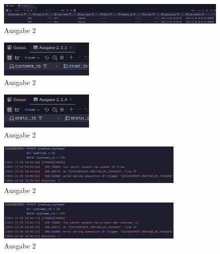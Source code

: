 \documentclass[12pt]{scrartcl}
\begin{document}
\pagebreak

\begin{figure}[H]
	\centering
	\includegraphics[width=1\textwidth]{../2_3_2.png}
	\caption{Ausgabe 2}
\end{figure}

\begin{figure}[H]
	\centering
	\includegraphics[width=0.4\textwidth]{../2_3_3.png}
	\caption{Ausgabe 2}
\end{figure}

\begin{figure}[H]
	\centering
	\includegraphics[width=0.4\textwidth]{../2_3_4.png}
	\caption{Ausgabe 2}
\end{figure}

\begin{figure}[H]
	\centering
	\includegraphics[width=0.8\textwidth]{../2_3_5.png}
	\caption{Ausgabe 2}
\end{figure}

\begin{figure}[H]
	\centering
	\includegraphics[width=0.8\textwidth]{../2_3_6.png}
	\caption{Ausgabe 2}
\end{figure}
\end{document}
